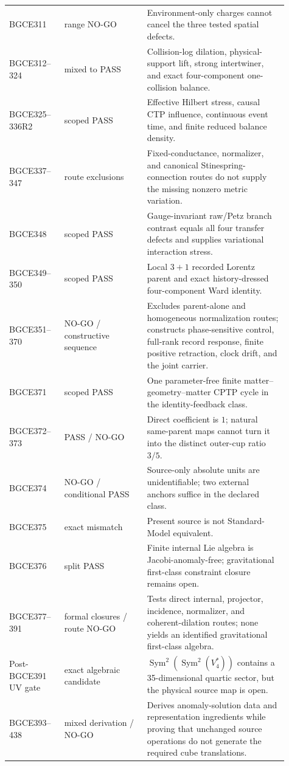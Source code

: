\documentclass[11pt]{article}
\theoremstyle{definition}
\theoremstyle{remark}
\newcommand{\Sym}{\operatorname{Sym}}
\begin{document}
\begin{longtable}{>{\raggedright\arraybackslash}p{0.18\linewidth} >{\raggedright\arraybackslash}p{0.27\linewidth} >{\raggedright\arraybackslash}p{0.46\linewidth}}
BGCE311 & range NO-GO & Environment-only charges cannot cancel the three tested spatial defects. \\
BGCE312--324 & mixed to PASS & Collision-log dilation, physical-support lift, strong intertwiner, and exact four-component one-collision balance. \\
BGCE325--336R2 & scoped PASS & Effective Hilbert stress, causal CTP influence, continuous event time, and finite reduced balance density. \\
BGCE337--347 & route exclusions & Fixed-conductance, normalizer, and canonical Stinespring-connection routes do not supply the missing nonzero metric variation. \\
BGCE348 & scoped PASS & Gauge-invariant raw/Petz branch contrast equals all four transfer defects and supplies variational interaction stress. \\
BGCE349--350 & scoped PASS & Local $3+1$ recorded Lorentz parent and exact history-dressed four-component Ward identity. \\
BGCE351--370 & NO-GO / constructive sequence & Excludes parent-alone and homogeneous normalization routes; constructs phase-sensitive control, full-rank record response, finite positive retraction, clock drift, and the joint carrier. \\
BGCE371 & scoped PASS & One parameter-free finite matter--geometry--matter CPTP cycle in the identity-feedback class. \\
BGCE372--373 & PASS / NO-GO & Direct coefficient is $1$; natural same-parent maps cannot turn it into the distinct outer-cup ratio $3/5$. \\
BGCE374 & NO-GO / conditional PASS & Source-only absolute units are unidentifiable; two external anchors suffice in the declared class. \\
BGCE375 & exact mismatch & Present source is not Standard-Model equivalent. \\
BGCE376 & split PASS & Finite internal Lie algebra is Jacobi-anomaly-free; gravitational first-class constraint closure remains open. \\
BGCE377--391 & formal closures / route NO-GO & Tests direct internal, projector, incidence, normalizer, and coherent-dilation routes; none yields an identified gravitational first-class algebra. \\
Post-BGCE391 UV gate & exact algebraic candidate & $\Sym^2(\Sym^2(V_4^*))$ contains a 35-dimensional quartic sector, but the physical source map is open. \\
BGCE393--438 & mixed derivation / NO-GO & Derives anomaly-solution data and representation ingredients while proving that unchanged source operations do not generate the required cube translations. \\

\end{longtable}
\end{document}
